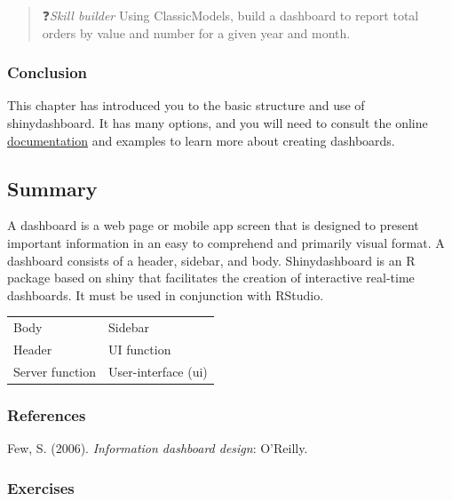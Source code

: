 \documentclass[
]{article}
\begin{document}
\begin{quote}
❓\emph{Skill builder} Using ClassicModels, build a dashboard to report total orders by value and number for a given year and month.
\end{quote}

\hypertarget{conclusion-2}{%
\subsubsection*{Conclusion}\label{conclusion-2}}

This chapter has introduced you to the basic structure and use of
shinydashboard. It has many options, and you will need to consult the
online
\href{http://rpackages.ianhowson.com/cran/shinydashboard/}{\underline{documentation}}
and examples to learn more about creating dashboards.

\hypertarget{summary-11}{%
\subsection*{Summary}\label{summary-11}}

A dashboard is a web page or mobile app screen that is designed to
present important information in an easy to comprehend and primarily
visual format. A dashboard consists of a header, sidebar, and body.
Shinydashboard is an R package based on shiny that facilitates the
creation of interactive real-time dashboards. It must be used in
conjunction with RStudio.

\begin{longtable}[]{@{}ll@{}}
\toprule
& \\
\midrule
\endhead
Body & Sidebar \\
Header & UI function \\
Server function & User-interface (ui) \\
\bottomrule
\end{longtable}

\hypertarget{references}{%
\subsubsection*{References}\label{references}}

Few, S. (2006). \emph{Information dashboard design}: O'Reilly.

\hypertarget{exercises-10}{%
\subsubsection*{Exercises}\label{exercises-10}}
\end{document}
